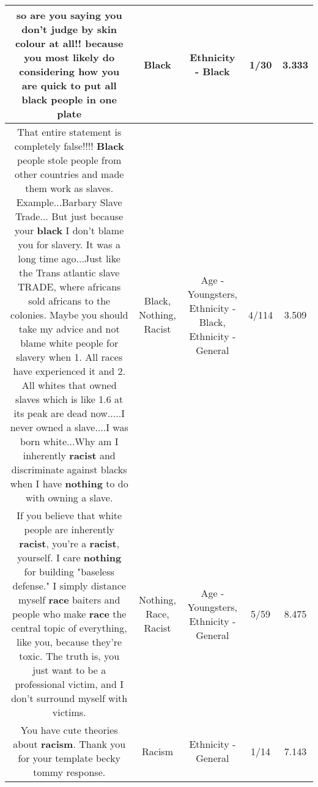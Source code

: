 \documentclass[11pt]{article}
\newlength\mylength
\begin{document}
\begin{center}
\begin{longtable}{|C{.65\mylength}|C{.30\mylength}|C{.12\mylength}|C{.12\mylength}|C{.12\mylength}|}
  \small so are you saying you don't judge by skin colour at all!! because you most likely do considering how you are quick to put all \textbf{black} people in one plate\normalsize   & Black & Ethnicity - Black & 1/30 & 3.333 \\  \hline
  \small That entire statement is completely false!!!! \textbf{Black} people stole people from other countries and made them work as slaves. Example...Barbary Slave Trade... But just because your \textbf{black} I don't blame you for slavery. It was a long time ago...Just like the Trans atlantic slave TRADE, where africans sold africans to the colonies. Maybe you should take my advice and not blame white people for slavery when 1. All races have experienced it and 2. All whites that owned slaves which is like 1.6 at its peak are dead now.....I never owned a slave....I was born white...Why am I inherently \textbf{racist} and discriminate against blacks when I have \textbf{nothing} to do with owning a slave.\normalsize   & Black, Nothing, Racist & Age - Youngsters, Ethnicity - Black, Ethnicity - General & 4/114 & 3.509 \\  \hline
  \small If you believe that white people are inherently \textbf{racist}, you're a \textbf{racist}, yourself.  I care \textbf{nothing} for building "baseless defense."  I simply distance myself \textbf{race} baiters and people who make \textbf{race} the central topic of everything, like you, because they're toxic.  The truth is, you just want to be a professional victim, and I don't surround myself with victims.\normalsize   & Nothing, Race, Racist & Age - Youngsters, Ethnicity - General & 5/59 & 8.475 \\  \hline
  \small You have cute theories about \textbf{racism}. Thank you for your template becky tommy response.\normalsize   & Racism & Ethnicity - General & 1/14 & 7.143 \\  \hline

\end{longtable}
\end{center}
\end{document}

